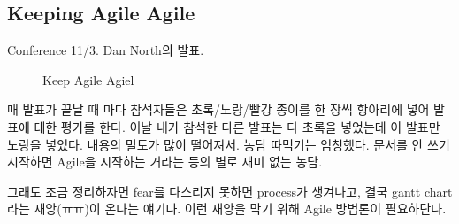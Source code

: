 \documentclass[11pt]{article}
\begin{document}
%  
%  
 
\subsection{Keeping Agile Agile}

Conference 11/3. Dan North의 발표. 

\begin{figure}[t]
    \begin{Frame}
        \begin{center}
        \end{center}
    \end{Frame}
    \caption{Keep Agile Agiel}
    \label{agile agile}
\end{figure}

매 발표가 끝날 때 마다 참석자들은 초록/노랑/빨강 종이를 한 장씩 항아리에 넣어
발표에 대한 평가를 한다. 이날 내가 참석한 다른 발표는 다 초록을
넣었는데 이 발표만 노랑을 넣었다. 내용의 밀도가 많이 떨어져서. 
농담 따먹기는 엄청했다. 문서를 안 쓰기 시작하면 Agile을 시작하는 거라는 
등의 별로 재미 없는 농담.

그래도 조금 정리하자면 fear를 다스리지 못하면 process가 생겨나고, 
결국 gantt chart라는 재앙(ㅠㅠ)이 온다는 얘기다. 이런 재앙을 막기 위해 Agile 
방법론이 필요하단다.
\end{document}
